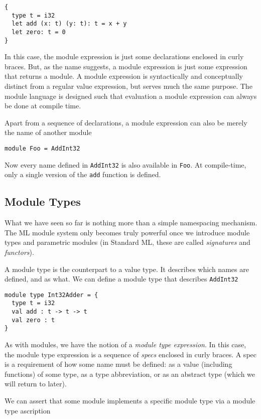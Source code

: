 \documentclass[oneside,11pt]{book}
\begin{document}
\begin{lstlisting}
{
  type t = i32
  let add (x: t) (y: t): t = x + y
  let zero: t = 0
}
\end{lstlisting}

In this case, the module expression is just some declarations enclosed
in curly braces.  But, as the name suggests, a module expression is
just some expression that returns a module.  A module expression is
syntactically and conceptually distinct from a regular value
expression, but serves much the same purpose.  The module language is
designed such that evaluation a module expression can always be done
at compile time.

Apart from a sequence of declarations, a module expression can also be
merely the name of another module

\begin{lstlisting}
module Foo = AddInt32
\end{lstlisting}

Now every name defined in \texttt{AddInt32} is also available in
\texttt{Foo}.  At compile-time, only a single version of the
\texttt{add} function is defined.

\subsection{Module Types}

What we have seen so far is nothing more than a simple namespacing
mechanism.  The ML module system only becomes truly powerful once we
introduce module types and parametric modules (in Standard ML, these
are called \textit{signatures} and \textit{functors}).

A module type is the counterpart to a value type.  It describes which
names are defined, and as what.  We can define a module type that
describes \texttt{AddInt32}

\begin{lstlisting}
module type Int32Adder = {
  type t = i32
  val add : t -> t -> t
  val zero : t
}
\end{lstlisting}

As with modules, we have the notion of a \textit{module type expression}.  In
this case, the module type expression is a sequence of \textit{specs}
enclosed in curly braces.  A spec is a requirement of how some name
must be defined: as a value (including functions) of some type, as a
type abbreviation, or as an abstract type (which we will return to
later).

We can assert that some module implements a specific module type via
a module type ascription
\end{document}

